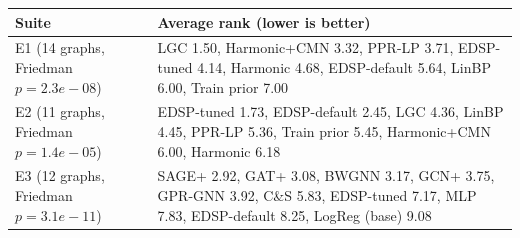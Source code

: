 \begin{tabular}{lp{11cm}}
\toprule
Suite & Average rank (lower is better) \\
\midrule
E1 (14 graphs, Friedman $p=2.3e-08$) & LGC 1.50, Harmonic+CMN 3.32, PPR-LP 3.71, EDSP-tuned 4.14, Harmonic 4.68, EDSP-default 5.64, LinBP 6.00, Train prior 7.00 \\
E2 (11 graphs, Friedman $p=1.4e-05$) & EDSP-tuned 1.73, EDSP-default 2.45, LGC 4.36, LinBP 4.45, PPR-LP 5.36, Train prior 5.45, Harmonic+CMN 6.00, Harmonic 6.18 \\
E3 (12 graphs, Friedman $p=3.1e-11$) & SAGE+ 2.92, GAT+ 3.08, BWGNN 3.17, GCN+ 3.75, GPR-GNN 3.92, C\&S 5.83, EDSP-tuned 7.17, MLP 7.83, EDSP-default 8.25, LogReg (base) 9.08 \\
\bottomrule
\end{tabular}
